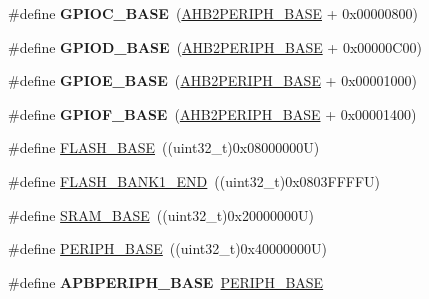 \begin{DoxyCompactItemize}
\mbox{\label{group___peripheral__memory__map_ga26f267dc35338eef219544c51f1e6b3f}} 
\#define {\bfseries G\+P\+I\+O\+C\+\_\+\+B\+A\+SE}~(\hyperlink{group___peripheral__memory__map_gaeedaa71d22a1948492365e2cd26cfd46}{A\+H\+B2\+P\+E\+R\+I\+P\+H\+\_\+\+B\+A\+SE} + 0x00000800)
\item 
\mbox{\label{group___peripheral__memory__map_ga1a93ab27129f04064089616910c296ec}} 
\#define {\bfseries G\+P\+I\+O\+D\+\_\+\+B\+A\+SE}~(\hyperlink{group___peripheral__memory__map_gaeedaa71d22a1948492365e2cd26cfd46}{A\+H\+B2\+P\+E\+R\+I\+P\+H\+\_\+\+B\+A\+SE} + 0x00000\+C00)
\item 
\mbox{\label{group___peripheral__memory__map_gab487b1983d936c4fee3e9e88b95aad9d}} 
\#define {\bfseries G\+P\+I\+O\+E\+\_\+\+B\+A\+SE}~(\hyperlink{group___peripheral__memory__map_gaeedaa71d22a1948492365e2cd26cfd46}{A\+H\+B2\+P\+E\+R\+I\+P\+H\+\_\+\+B\+A\+SE} + 0x00001000)
\item 
\mbox{\label{group___peripheral__memory__map_ga7f9a3f4223a1a784af464a114978d26e}} 
\#define {\bfseries G\+P\+I\+O\+F\+\_\+\+B\+A\+SE}~(\hyperlink{group___peripheral__memory__map_gaeedaa71d22a1948492365e2cd26cfd46}{A\+H\+B2\+P\+E\+R\+I\+P\+H\+\_\+\+B\+A\+SE} + 0x00001400)
\item 
\#define \hyperlink{group___peripheral__memory__map_ga23a9099a5f8fc9c6e253c0eecb2be8db}{F\+L\+A\+S\+H\+\_\+\+B\+A\+SE}~((uint32\+\_\+t)0x08000000\+U)
\item 
\#define \hyperlink{group___peripheral__memory__map_ga443a2786535d83e32dfdc2b29e379332}{F\+L\+A\+S\+H\+\_\+\+B\+A\+N\+K1\+\_\+\+E\+ND}~((uint32\+\_\+t)0x0803\+F\+F\+F\+F\+U)
\item 
\#define \hyperlink{group___peripheral__memory__map_ga05e8f3d2e5868754a7cd88614955aecc}{S\+R\+A\+M\+\_\+\+B\+A\+SE}~((uint32\+\_\+t)0x20000000\+U)
\item 
\#define \hyperlink{group___peripheral__memory__map_ga9171f49478fa86d932f89e78e73b88b0}{P\+E\+R\+I\+P\+H\+\_\+\+B\+A\+SE}~((uint32\+\_\+t)0x40000000\+U)
\item 
\mbox{\label{group___peripheral__memory__map_gac85f31889eb6a3f651b563bbc7131f91}} 
\#define {\bfseries A\+P\+B\+P\+E\+R\+I\+P\+H\+\_\+\+B\+A\+SE}~\hyperlink{group___peripheral__memory__map_ga9171f49478fa86d932f89e78e73b88b0}{P\+E\+R\+I\+P\+H\+\_\+\+B\+A\+SE}

\end{DoxyCompactItemize}
